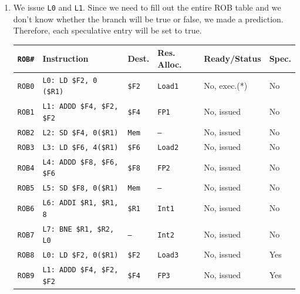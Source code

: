 \begin{enumerate}
    \newpage


    \item We issue \texttt{L0} and \texttt{L1}. Since we need to fill out the entire ROB table and we don't know whether the branch will be true or false, we made a prediction. Therefore, each speculative entry will be set to true.
    \begin{table}[!htp]
        \centering
        \begin{adjustbox}{width={\textwidth},totalheight={\textheight},keepaspectratio}
            \begin{tabular}{@{} l l l l l l @{}}
                \toprule
                \texttt{ROB\#}  & \textbf{Instruction} & \textbf{Dest.} & \textbf{Res. Alloc.} & \textbf{Ready/Status} & \textbf{Spec.} \\
                \midrule
                \texttt{ROB0}   & \texttt{L0: LD \$F2, 0 (\$R1)}    & \texttt{\$F2} & \texttt{Load1}    & No, exec.(*)  & No    \\ [.3em]
                \texttt{ROB1}   & \texttt{L1: ADDD \$F4, \$F2, \$F2}& \texttt{\$F4} & \texttt{FP1}      & No, issued    & No    \\ [.3em]
                \texttt{ROB2}   & \texttt{L2: SD \$F4, 0(\$R1)}     & \texttt{Mem}  & \texttt{--}       & No, issued    & No    \\ [.3em]
                \texttt{ROB3}   & \texttt{L3: LD \$F6, 4(\$R1)}     & \texttt{\$F6} & \texttt{Load2}    & No, issued    & No    \\ [.3em]
                \texttt{ROB4}   & \texttt{L4: ADDD \$F8, \$F6, \$F6}& \texttt{\$F8} & \texttt{FP2}      & No, issued    & No    \\ [.3em]
                \texttt{ROB5}   & \texttt{L5: SD \$F8, 0(\$R1)}     & \texttt{Mem}  & \texttt{--}       & No, issued    & No    \\ [.3em]
                \texttt{ROB6}   & \texttt{L6: ADDI \$R1, \$R1, 8}   & \texttt{\$R1} & \texttt{Int1}     & No, issued    & No    \\ [.3em]
                \texttt{ROB7}   & \texttt{L7: BNE \$R1, \$R2, L0}   & \texttt{--}   & \texttt{Int2}     & No, issued    & No    \\ [.3em]
                \texttt{ROB8}   & \texttt{L0: LD \$F2, 0(\$R1)}     & \texttt{\$F2} & \texttt{Load3}    & No, issued    & Yes   \\ [.3em]
                \texttt{ROB9}   & \texttt{L1: ADDD \$F4, \$F2, \$F2}& \texttt{\$F4} & \texttt{FP3}      & No, issued    & Yes   \\

\end{tabular}
\end{adjustbox}
\end{table}
\end{enumerate}
